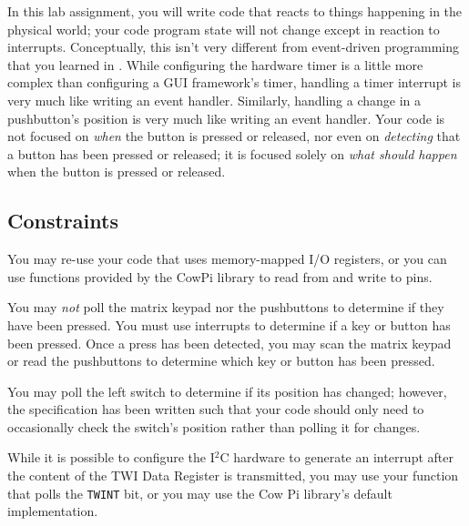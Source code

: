 In this lab assignment, you will write code that reacts to things happening in
the physical world; your code program state will not change except in reaction to interrupts.
Conceptually, this isn't very different from event-driven programming that you
learned in \cstwo. While configuring the hardware timer is a little more complex
than configuring a GUI framework's timer, handling a timer interrupt is very
much like writing an  event handler. Similarly, handling
a change in a pushbutton's position is very much like writing an
 event handler. Your code is not focused on \textit{when}
the button is pressed or released, nor even on \textit{detecting} that a button
has been pressed or released; it is focused solely on \textit{what should happen}
when the button is pressed or released.

\subsection{Constraints}


You may re-use your code that uses memory-mapped I/O registers, or you can use
functions provided by the CowPi library to read from and write to pins.

You may \textit{not} poll the matrix keypad nor the pushbuttons to determine
if they have been pressed. You must use interrupts to determine if a key or
button has been pressed. Once a press has been detected, you may scan the
matrix keypad or read the pushbuttons to determine which key or button has
been pressed.

You may poll the left switch to determine if its position has changed;
however, the specification has been written such that your code should only
need to occasionally check the switch's position rather than polling it for
changes.


While it is possible to configure the I$^2$C hardware to generate an interrupt
after the content of the TWI Data Register is transmitted, you may use your
 function that polls the \texttt{TWINT} bit, or you may
use the Cow Pi library's default implementation.


